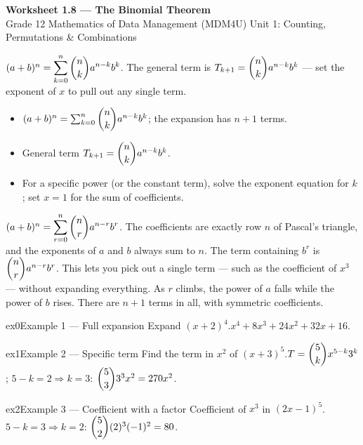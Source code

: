 \documentclass[11pt]{article}
\begin{document}
\begin{center}
{\LARGE\bfseries\color{titleblue}Worksheet 1.8 --- The Binomial Theorem}\\[2pt]
{\small Grade 12 Mathematics of Data Management (MDM4U) \textperiodcentered{} Unit 1: Counting, Permutations \& Combinations}
\end{center}

\begin{ideabox}
$(a+b)^n=\displaystyle\sum_{k=0}^{n}\dbinom{n}{k}a^{n-k}b^{k}$. The general term is $T_{k+1}=\dbinom{n}{k}a^{n-k}b^{k}$ --- set the exponent of $x$ to pull out any single term.
\begin{itemize}[leftmargin=*,itemsep=2pt]
  \item $(a+b)^n=\sum_{k=0}^{n}\dbinom{n}{k}a^{n-k}b^{k}$; the expansion has $n+1$ terms.
  \item General term $T_{k+1}=\dbinom{n}{k}a^{n-k}b^{k}$.
  \item For a specific power (or the constant term), solve the exponent equation for $k$; set $x=1$ for the sum of coefficients.
\end{itemize}
\end{ideabox}

\begin{learnbox}
$(a+b)^n=\displaystyle\sum_{r=0}^{n}\dbinom{n}{r}a^{n-r}b^{r}$. The coefficients are exactly row $n$ of Pascal's triangle, and the exponents of $a$ and $b$ always sum to $n$.
The term containing $b^{r}$ is $\dbinom{n}{r}a^{n-r}b^{r}$. This lets you pick out a single term — such as the coefficient of $x^3$ — without expanding everything.
As $r$ climbs, the power of $a$ falls while the power of $b$ rises. There are $n+1$ terms in all, with symmetric coefficients.
\end{learnbox}


\begin{example}{ex0}{Example 1 --- Full expansion}
Expand $(x+2)^4$.\soln $x^4+8x^3+24x^2+32x+16$.
\end{example}

\begin{example}{ex1}{Example 2 --- Specific term}
Find the term in $x^2$ of $(x+3)^5$.\soln $T=\dbinom{5}{k}x^{5-k}3^{k}$; $5-k=2\Rightarrow k=3$: $\dbinom{5}{3}3^3x^2=270x^2$.
\end{example}

\begin{example}{ex2}{Example 3 --- Coefficient with a factor}
Coefficient of $x^3$ in $(2x-1)^5$.\soln $5-k=3\Rightarrow k=2$: $\dbinom{5}{2}(2)^3(-1)^2=80$.
\end{example}
\end{document}
